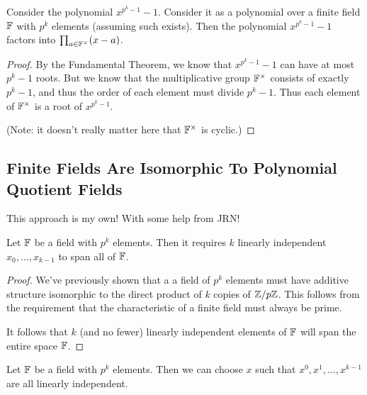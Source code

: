 \begin{proposition}
  Consider the polynomial $x^{p^k - 1} - 1$. Consider it as a polynomial
  over a finite field $\mathbb{F}$ with $p^k$ elements (assuming such exists).
  Then the polynomial $x^{p^k - 1} - 1$ factors into $\prod_{a\in
  \mathbb{F}^\times} \mathopen{}\left( {x - a} \right)\mathclose{}$.
\end{proposition}

\begin{proof}
  By the Fundamental Theorem, we know that $x^{p^k - 1} - 1$ can have at
  most $p^k - 1$ roots. But we know that the multiplicative group
  $\mathbb{F}^\times$ consists of exactly $p^k - 1$, and thus the order of each
  element must divide $p^k - 1$. Thus each element of $\mathbb{F}^\times$ is a
  root of $x^{p^k - 1}$.

  (Note: it doesn't really matter here that $\mathbb{F}^\times$ is cyclic.)
\end{proof}

\subsection{Finite Fields Are Isomorphic To Polynomial Quotient Fields}

\begin{remark}
  This approach is my own! With some help from JRN!
\end{remark}

\begin{lemma}
  Let $\mathbb{F}$ be a field with $p^k$ elements. Then it requires $k$ linearly
  independent $x_0, \ldots, x_{k-1}$ to span all of $\mathbb{F}$.
\end{lemma}

\begin{proof}
  We've previously shown that a a field of $p^k$ elements must have
  additive structure isomorphic to the direct product of $k$ copies of
  $\mathbb{Z} / p\mathbb{Z}$. This follows from the requirement that the characteristic of
  a finite field must always be prime.

  It follows that $k$ (and no fewer) linearly independent elements of
  $\mathbb{F}$ will span the entire space $\mathbb{F}$.
\end{proof}

\begin{lemma}
  Let $\mathbb{F}$ be a field with $p^k$ elements. Then we can choose $x$ such
  that $x^0, x^1, \ldots, x^{k-1}$ are all linearly independent.
\end{lemma}

